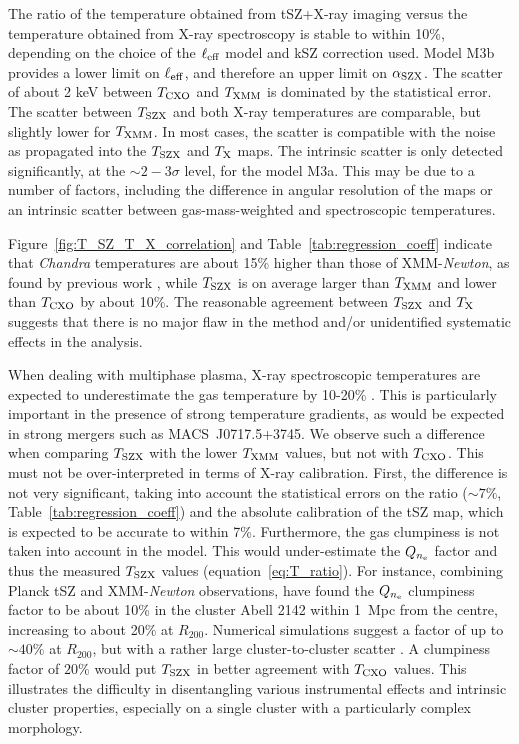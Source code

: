 \documentclass[twocolumn,traditabstract]{aa}
\def\TSZ {T_{\rm SZX}}
\def \TXC {T_{\rm CXO}}
\def \TXX {T_{\rm XMM}}
\def \TX {T_{\rm X}}
\begin{document}
The ratio of the temperature obtained from tSZ+X-ray imaging versus the temperature obtained from X-ray spectroscopy is stable to within 10\%, depending on the choice of the $\ell_{\rm eff}$ model and kSZ correction used. Model M3b provides a lower limit on $\ell_{\rm eff}$, and therefore an upper limit on $\alpha_{\rm SZX}$. The scatter of about 2 keV between $\TXC$ and $\TXX$ is dominated by the statistical error. The scatter between $\TSZ$ and both X-ray temperatures are comparable, but slightly lower for $\TXX$. In most cases, the scatter is compatible with the noise as propagated into the $\TSZ$ and $\TX$ maps. The intrinsic scatter is only detected significantly, at the $\sim 2-3\sigma$ level, for the model M3a. This may be due to a number of factors, including the difference in angular resolution of the maps or an intrinsic scatter between gas-mass-weighted and spectroscopic temperatures.

Figure~\ref{fig:T_SZ_T_X_correlation} and Table~\ref{tab:regression_coeff} indicate that \textit{Chandra} temperatures are about 15\% higher than those of XMM-\textit{Newton}, as found by previous work \citep{Mahdavi2013,sch15}, while $\TSZ$ is on average larger than $\TXX$ and lower than $\TXC$ by about 10\%. The reasonable agreement between $\TSZ$ and $\TX$ suggests that there is no major flaw in the method and/or unidentified systematic effects in the analysis.

When dealing with multiphase plasma, X-ray spectroscopic temperatures are expected to underestimate the gas temperature by 10-20\% \citep{Mathiesen2001,maz04}. This is particularly important in the presence of strong temperature gradients, as would be expected in strong mergers such as \mbox{MACS~J0717.5+3745}. We observe such a difference when comparing $\TSZ$ with the lower $\TXX$ values, but not with $\TXC$. This must not be over-interpreted in terms of X-ray calibration. First, the difference is not very significant, taking into account the statistical errors on the ratio ($\sim 7\%$, Table~\ref{tab:regression_coeff}) and the absolute calibration of the tSZ map, which is expected to be accurate to within 7\%. Furthermore, the gas clumpiness is not taken into account in the model. This would under-estimate the $Q_{n_{\rm e}}$ factor and thus the measured $\TSZ$ values (equation~\ref{eq:T_ratio}). For instance, combining Planck tSZ \citep{Planck2015I} and XMM-\textit{Newton} observations, \citet{Tchernin2016} have found the $Q_{n_{\rm e}}$ clumpiness factor to be about 10\% in the cluster Abell 2142 within 1~Mpc from the centre, increasing to about 20\% at $R_{200}$. Numerical simulations suggest a factor of up to $\sim 40$\% at $R_{200}$, but with a rather large cluster-to-cluster scatter \citep[e.g.][]{Nagai2011,Zhuravleva2013,Vazza2013}. A clumpiness factor of $20\%$ would put $\TSZ$ in better agreement with $\TXC$ values. This illustrates the difficulty in disentangling various instrumental effects and intrinsic cluster properties, especially on a single cluster with a particularly complex morphology.
\end{document}
